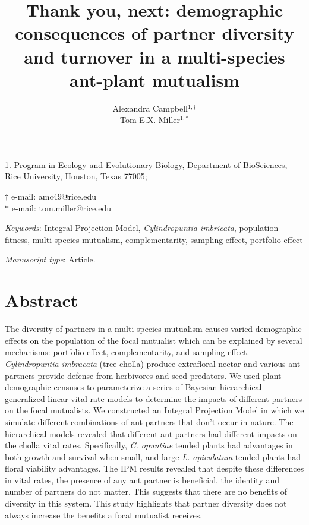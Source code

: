 \documentclass[11pt]{article}
\title{Thank you, next: demographic consequences of partner diversity and turnover in a multi-species ant-plant mutualism}
\author{Alexandra Campbell$^{1,\dagger}$ \\ 
	Tom E.X. Miller$^{1,\ast}$}
\date{}
\begin{document}
	
	\maketitle
	
	\noindent{} 1. Program in Ecology and Evolutionary Biology, Department of BioSciences, Rice University, Houston, Texas 77005;
	
	\noindent{} $\dagger$ e-mail: amc49@rice.edu\\
	\noindent{} $\ast$ e-mail: tom.miller@rice.edu
	
	\bigskip
	
	\textit{Keywords}: Integral Projection Model, \textit{Cylindropuntia imbricata}, population fitness, multi-species mutualism, complementarity, sampling effect, portfolio effect
	
	\bigskip
	
	\textit{Manuscript type}: Article.
	
	\bigskip
	
	
\linenumbers{}
\modulolinenumbers[3]

\newpage{}

	\section*{Abstract}
 The diversity of partners in a multi-species mutualism causes varied demographic effects on the population of the focal mutualist which can be explained by several mechanisms: portfolio effect, complementarity, and sampling effect.
\textit{Cylindropuntia imbracata} (tree cholla) produce extrafloral nectar and various ant partners provide defense from herbivores and seed predators. 
We used plant demographic censuses to parameterize a series of Bayesian hierarchical generalized linear vital rate models to determine the impacts of different partners on the focal mutualists. 
We constructed an Integral Projection Model in which we simulate different combinations of ant partners that don’t occur in nature.
The hierarchical models revealed that different ant partners had different impacts on the cholla vital rates. 
Specifically, \textit{C. opuntiae} tended plants had advantages in both growth and survival when small, and large \textit{L. apiculatum} tended plants had floral viability advantages. 
The IPM results revealed that despite these differences in vital rates, the presence of any ant partner is beneficial, the identity and number of partners do not matter.
This suggests that there are no benefits of diversity in this system.
This study highlights that partner diversity does not always increase the benefits a focal mutualist receives.
\end{document}
